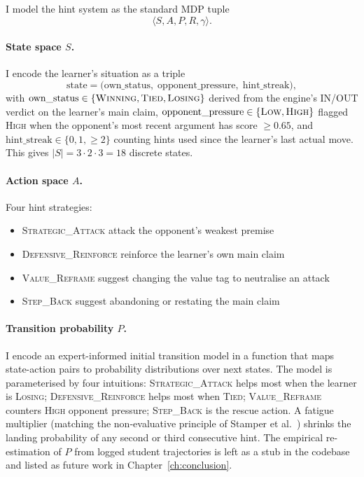 I model the hint system as the standard MDP tuple
\[
\langle S, A, P, R, \gamma \rangle.
\]

\paragraph{State space $S$.} I encode the learner's situation as a triple
\[
\text{state} = \big(\text{own\_status},\; \text{opponent\_pressure},\; \text{hint\_streak}\big),
\]
with $\text{own\_status} \in \{\textsc{Winning}, \textsc{Tied}, \textsc{Losing}\}$ derived from the engine's IN/OUT verdict on the learner's main claim, $\text{opponent\_pressure} \in \{\textsc{Low}, \textsc{High}\}$ flagged \textsc{High} when the opponent's most recent argument has score $\geq 0.65$, and $\text{hint\_streak} \in \{0, 1, \geq\!2\}$ counting hints used since the learner's last actual move. This gives $|S| = 3 \cdot 2 \cdot 3 = 18$ discrete states.

\paragraph{Action space $A$.} Four hint strategies:
\begin{itemize}
    \item \textsc{Strategic\_Attack} attack the opponent's weakest premise
    \item \textsc{Defensive\_Reinforce} reinforce the learner's own main claim
    \item \textsc{Value\_Reframe} suggest changing the value tag to neutralise an attack
    \item \textsc{Step\_Back} suggest abandoning or restating the main claim
\end{itemize}

\paragraph{Transition probability $P$.} I encode an expert-informed initial transition model in a function that maps state-action pairs to probability distributions over next states. The model is parameterised by four intuitions: \textsc{Strategic\_Attack} helps most when the learner is \textsc{Losing}; \textsc{Defensive\_Reinforce} helps most when \textsc{Tied}; \textsc{Value\_Reframe} counters \textsc{High} opponent pressure; \textsc{Step\_Back} is the rescue action. A fatigue multiplier (matching the non-evaluative principle of Stamper et al.~\cite{stamper2011hints}) shrinks the landing probability of any second or third consecutive hint. The empirical re-estimation of $P$ from logged student trajectories is left as a stub in the codebase and listed as future work in Chapter~\ref{ch:conclusion}.

